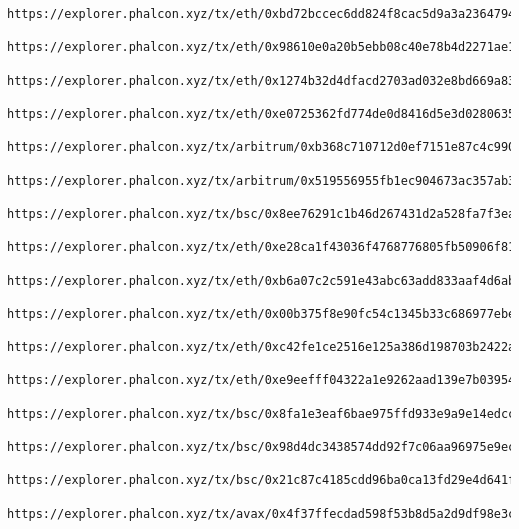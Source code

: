 \begin{lstlisting}
https://explorer.phalcon.xyz/tx/eth/0xbd72bccec6dd824f8cac5d9a3a2364794c9272d7f7348d074b580e3c6e44312e

https://explorer.phalcon.xyz/tx/eth/0x98610e0a20b5ebb08c40e78b4d2271ae1fbd4fc3b8783b1bb7a5687918fad54e,0x4629b7622c1beba84fdbbac78432fe06707894c8ed40811b1b70815e8a7efe7a,0xd37b233487b08906d765aeb5c74f394d8544ae8b4e68e5b0a6ef7a2646597700,0xf8164a54d943386839d7ff6c85e282da4409dda69702899204b9c25e028f7e18,

https://explorer.phalcon.xyz/tx/eth/0x1274b32d4dfacd2703ad032e8bd669a83f012dde9d27ed92e4e7da0387adafe4

https://explorer.phalcon.xyz/tx/eth/0xe0725362fd774de0d8416d5e3d028063508ffa61f68087c576320e42159677a9

https://explorer.phalcon.xyz/tx/arbitrum/0xb368c710712d0ef7151e87c4c99074efe1c0632eaa49c4d967b21e085303a714,0x9ba3374d1245d449e883d0325dea3f6d2e02e8703b7a438f0f66f7c399ec6bd7

https://explorer.phalcon.xyz/tx/arbitrum/0x519556955fb1ec904673ac357ab3e7dfea24d8fc3fad5554aada6566ac71036b

https://explorer.phalcon.xyz/tx/bsc/0x8ee76291c1b46d267431d2a528fa7f3ea7035629500bba4f87a69b88fcaf6e23

https://explorer.phalcon.xyz/tx/eth/0xe28ca1f43036f4768776805fb50906f8172f75eba3bf1d9866bcd64361fda834

https://explorer.phalcon.xyz/tx/eth/0xb6a07c2c591e43abc63add833aaf4d6ab47e66f05cf6b49a9dda7c2317b2d61c 

https://explorer.phalcon.xyz/tx/eth/0x00b375f8e90fc54c1345b33c686977ebec26877e2c8cac165429927a6c9bdbec

https://explorer.phalcon.xyz/tx/eth/0xc42fe1ce2516e125a386d198703b2422aa0190b25ef6a7b0a1d3c6f5d199ffad

https://explorer.phalcon.xyz/tx/eth/0xe9eefff04322a1e9262aad139e7b03954709a7c2ffea5ba9d1026a24fb58c029

https://explorer.phalcon.xyz/tx/bsc/0x8fa1e3eaf6bae975ffd933e9a9e14edccbcc61bd02b2239179adeb5e17c013d5

https://explorer.phalcon.xyz/tx/bsc/0x98d4dc3438574dd92f7c06aa96975e9ecf68ebcbbf1f1113e9c14d2a8b8c4e7f

https://explorer.phalcon.xyz/tx/bsc/0x21c87c4185cdd96ba0ca13fd29e4d641f3dac8e72124919dd55926c7d2c3bcdc

https://explorer.phalcon.xyz/tx/avax/0x4f37ffecdad598f53b8d5a2d9df98e3c00fbda4328585eb9947a412b5fe17ac5


\end{lstlisting}
